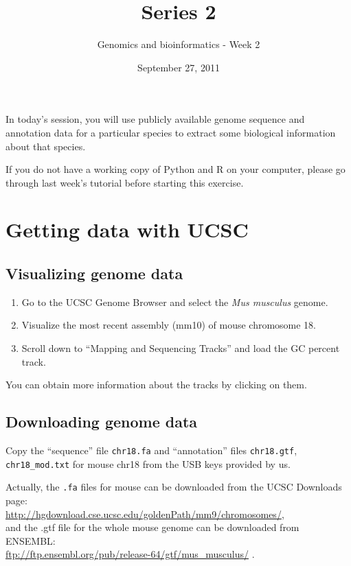 \documentclass[a4paper,11pt]{article}
\title{Series 2}
\date{September 27, 2011}
\author{Genomics and bioinformatics - Week 2}
\begin{document}
\maketitle


In today's session, you will use publicly available genome sequence and annotation data for a particular species
to extract some biological information about that species.

If you do not have a working copy of Python and R on your computer, please go through last week's tutorial before starting this exercise.



\section{Getting data with UCSC}
\subsection{Visualizing genome data}
\begin{enumerate}
\item Go to the UCSC Genome Browser and select the \textit{Mus musculus} genome.
\item Visualize the most recent assembly (mm10) of mouse chromosome 18.
\item Scroll down to ``Mapping and Sequencing Tracks'' and load the GC percent track.
\end{enumerate}
 You can obtain more information about the tracks by clicking on them.
\subsection{Downloading genome data}
Copy the ``sequence'' file \texttt{chr18.fa} and ``annotation'' files \texttt{chr18.gtf}, \texttt{chr18\_mod.txt} 
for mouse chr18 from the USB keys provided by us. 

Actually, the \texttt{.fa} files for mouse can be downloaded from the UCSC Downloads page:\\
\url{http://hgdownload.cse.ucsc.edu/goldenPath/mm9/chromosomes/},\\
and the .gtf file for the whole mouse genome can be downloaded from ENSEMBL:\\
\url{ftp://ftp.ensembl.org/pub/release-64/gtf/mus_musculus/} .
\end{document}
